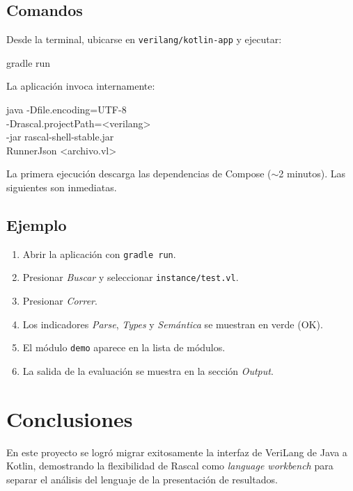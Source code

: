 \documentclass[12pt]{article}
\newcommand{\code}[1]{\texttt{#1}}
\begin{document}
\subsection{Comandos}

Desde la terminal, ubicarse en \code{verilang/kotlin-app} y ejecutar:

\begin{kotlin}
gradle run
\end{kotlin}

La aplicación invoca internamente:

\begin{kotlin}
java -Dfile.encoding=UTF-8 \\
     -Drascal.projectPath=<verilang> \\
     -jar rascal-shell-stable.jar \\
     RunnerJson <archivo.vl>
\end{kotlin}

La primera ejecución descarga las dependencias de Compose
($\sim$2 minutos). Las siguientes son inmediatas.

\subsection{Ejemplo}

\begin{enumerate}
  \item Abrir la aplicación con \code{gradle run}.
  \item Presionar \textit{Buscar} y seleccionar \code{instance/test.vl}.
  \item Presionar \textit{Correr}.
  \item Los indicadores \textit{Parse}, \textit{Types} y \textit{Semántica}
        se muestran en verde (OK).
  \item El módulo \code{demo} aparece en la lista de módulos.
  \item La salida de la evaluación se muestra en la sección \textit{Output}.
\end{enumerate}

\section{Conclusiones}

En este proyecto se logró migrar exitosamente la interfaz de VeriLang de
Java a Kotlin, demostrando la flexibilidad de Rascal como \emph{language
workbench} para separar el análisis del lenguaje de la presentación de
resultados.
\end{document}

